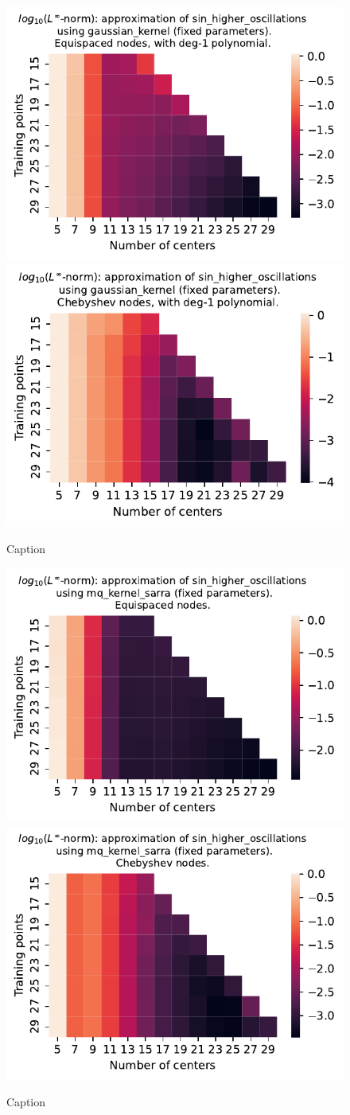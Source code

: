 \documentclass[12pt]{report} %
\begin{document}
\begin{figure}[ht]
    \centering
    \includegraphics[width=.49\textwidth]{imagenes/experiments/1d/least_squares/opt-sin_higher_oscillations-Kgaussian_kernel-Poly-Equi.pdf}
    \includegraphics[width=.49\textwidth]{imagenes/experiments/1d/least_squares/opt-sin_higher_oscillations-Kgaussian_kernel-Poly-Cheb.pdf}
    \caption{Caption}
    \label{fig:opt-sin-higher-oscillations-gaussian-poly}
\end{figure}

\begin{figure}[ht]
    \centering
    
    \includegraphics[width=.49\textwidth]{imagenes/experiments/1d/least_squares/opt-sin_higher_oscillations-Kmq_kernel_sarra-Equi.pdf}
    \includegraphics[width=.49\textwidth]{imagenes/experiments/1d/least_squares/opt-sin_higher_oscillations-Kmq_kernel_sarra-Cheb.pdf}
    \caption{Caption}
    \label{fig:opt-sin-higher-oscillations-sarra}
\end{figure}
\end{document}
